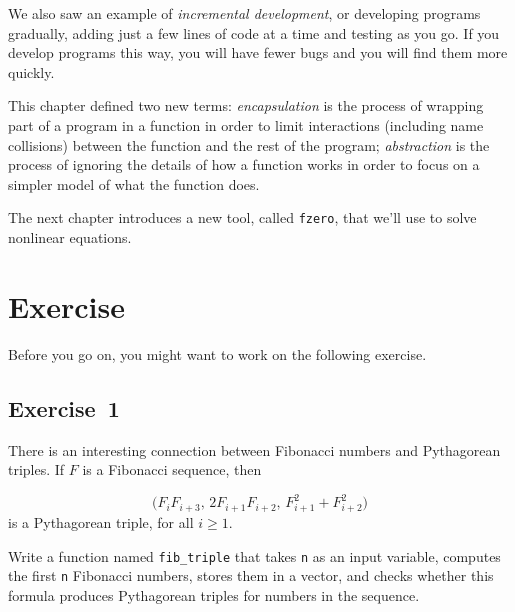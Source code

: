 We also saw an example of \emph{incremental development}, or developing programs gradually, adding just a few lines of code at a time and testing as you go.  If you develop programs this way, you will have fewer bugs and you will find them more quickly.

This chapter defined two new terms: \emph{encapsulation} is the process of wrapping part of a program in
a function in order to limit interactions (including name collisions)
between the function and the rest of the program; \emph{abstraction} is the process of ignoring the details of how a function works in order to focus on a simpler model of what the
function does.

The next chapter introduces a new tool, called \lstinline{fzero}, that we'll use to solve nonlinear equations.


\section{Exercise}

Before you go on, you might want to work on the following exercise.

\subsection{Exercise~1}

There is an interesting connection between Fibonacci numbers and
Pythagorean triples.  If $F$ is a Fibonacci sequence, then

\begin{equation*}
\big(F_i F_{i+3}, \, 2 F_{i+1} F_{i+2}, \, F_{i+1}^2 + F_{i+2}^2 \big)
\end{equation*}
is a Pythagorean triple, for all $i \ge 1$.

Write a function named \lstinline{fib_triple} that
takes \lstinline{n} as an input variable, computes 
the first \lstinline{n} Fibonacci numbers, stores them in a vector,
and checks whether this formula produces Pythagorean triples for numbers in the \mbox{sequence}.




